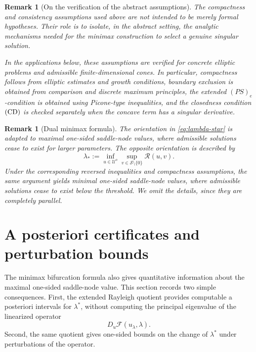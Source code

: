\documentclass[preprint,10pt]{elsarticle}
\numberwithin{equation}{section}
\newtheorem{rem}[thm]{Remark}
\begin{document}
\begin{rem}[On the verification of the abstract assumptions]
	The compactness and consistency assumptions used above are not intended to
	be merely formal hypotheses. Their role is to isolate, in the abstract
	setting, the analytic mechanisms needed for the minimax construction to
	select a genuine singular solution.
	
	In the applications below, these assumptions are verified for concrete
	elliptic problems and admissible finite-dimensional cones. In particular,
	compactness follows from elliptic estimates and growth conditions, boundary
	exclusion is obtained from comparison and discrete maximum principles,
	the extended \((PS)_e\)-condition is obtained using Picone-type
	inequalities, and the closedness condition \({\rm (CD)}\) is checked
	separately when the concave term has a singular derivative.
\end{rem}

\begin{rem}[Dual minimax formula]
	The orientation in \eqref{eq:lambda-star} is adapted to maximal one-sided
	saddle-node values, where admissible solutions cease to exist for larger
	parameters. The opposite orientation is described by
	\[
	\lambda_*
	:=
	\inf_{u\in\mathcal U^o}
	\sup_{v\in\mathcal S\setminus\{0\}}
	\mathcal R(u,v).
	\]
	Under the corresponding reversed inequalities and compactness assumptions,
	the same argument yields minimal one-sided saddle-node values, where
	admissible solutions cease to exist below the threshold. We omit the
	details, since they are completely parallel.
\end{rem}




\section{A posteriori certificates and perturbation bounds}
\label{sec6}

The minimax bifurcation formula also gives quantitative information about the
maximal one-sided saddle-node value. This section records two simple
consequences. First, the extended Rayleigh quotient provides computable
a posteriori intervals for \(\lambda^*\), without computing the principal
eigenvalue of the linearized operator
\[
D_u\mathcal F(u_\lambda,\lambda).
\]
Second, the same quotient gives one-sided bounds on the change of \(\lambda^*\)
under perturbations of the operator.
\end{document}
